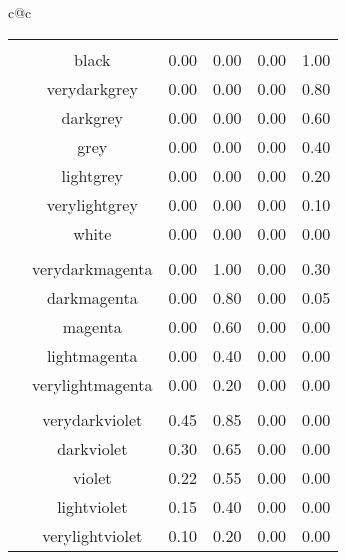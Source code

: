 %
%
%
\label{sec:colortable}
\newcommand{\clrow}[1]{
  \fcolorbox{black}{#1}{
    \textcolor{#1}{\rule[-.3ex]{1cm}{1.8ex}}
    } %
  & #1
  } %
\newcommand{\clspc}{&&&&&\\}
%
\vfill
\begin{table}[!ht]
\begin{center}
\begin{scriptsize}
  \begin{tabular}{c@{\quad}c}
    \begin{tabular}{|c|c|cccc|} \hline
      \clspc
      \clrow{black}                    & 0.00 & 0.00 & 0.00 & 1.00 \\
      \clrow{verydarkgrey}             & 0.00 & 0.00 & 0.00 & 0.80 \\
      \clrow{darkgrey}                 & 0.00 & 0.00 & 0.00 & 0.60 \\
      \clrow{grey}                     & 0.00 & 0.00 & 0.00 & 0.40 \\
      \clrow{lightgrey}                & 0.00 & 0.00 & 0.00 & 0.20 \\
      \clrow{verylightgrey}            & 0.00 & 0.00 & 0.00 & 0.10 \\
      \clrow{white}                    & 0.00 & 0.00 & 0.00 & 0.00 \\
      \clspc
      \clrow{verydarkmagenta}          & 0.00 & 1.00 & 0.00 & 0.30 \\
      \clrow{darkmagenta}              & 0.00 & 0.80 & 0.00 & 0.05 \\
      \clrow{magenta}                  & 0.00 & 0.60 & 0.00 & 0.00 \\
      \clrow{lightmagenta}             & 0.00 & 0.40 & 0.00 & 0.00 \\
      \clrow{verylightmagenta}         & 0.00 & 0.20 & 0.00 & 0.00 \\
      \clspc
      \clrow{verydarkviolet}           & 0.45 & 0.85 & 0.00 & 0.00 \\
      \clrow{darkviolet}               & 0.30 & 0.65 & 0.00 & 0.00 \\
      \clrow{violet}                   & 0.22 & 0.55 & 0.00 & 0.00 \\
      \clrow{lightviolet}              & 0.15 & 0.40 & 0.00 & 0.00 \\
      \clrow{verylightviolet}          & 0.10 & 0.20 & 0.00 & 0.00 \\

\end{tabular}
\end{tabular}
\end{scriptsize}
\end{center}
\end{table}
